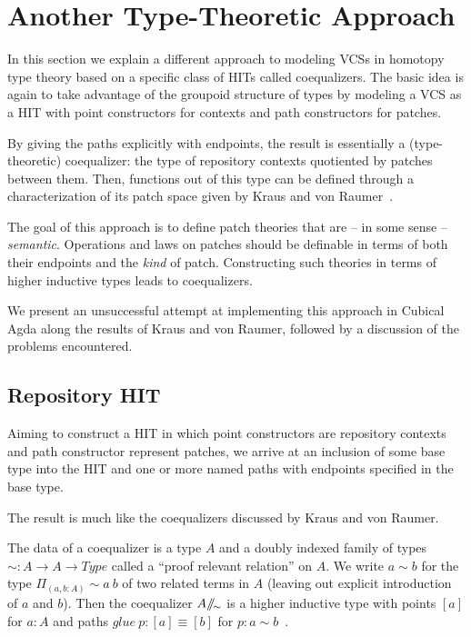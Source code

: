 \chapter{Another Type-Theoretic Approach}\label{sec:attempt}

In this section we explain a different approach to modeling VCSs in homotopy
type theory based on a specific class of HITs called coequalizers. The basic
idea is again to take advantage of the groupoid structure of types by modeling a
VCS as a HIT with point constructors for contexts and path constructors for
patches.

By giving the paths explicitly with endpoints, the result is essentially a
(type-theoretic) coequalizer: the type of repository contexts quotiented by
patches between them. Then, functions out of this type can be defined through a
characterization of its patch space given by Kraus and von Raumer~\cite{kraus2019path}.

The goal of this approach is to define patch theories that are -- in some sense
-- \emph{semantic}. Operations and laws on patches should be definable in terms
of both their endpoints and the \emph{kind} of patch. Constructing such theories in
terms of higher inductive types leads to coequalizers.

We present an unsuccessful attempt at implementing this approach in Cubical Agda
along the results of Kraus and von Raumer, followed by a discussion of the
problems encountered.

\section{Repository HIT}

Aiming to construct a HIT in which point constructors are repository contexts and
path constructor represent patches, we arrive at an inclusion of some base type
into the HIT and one or more named paths with endpoints specified in the base type.

The result is much like the coequalizers discussed by Kraus and von Raumer.

The data of a coequalizer is a type $A$ and a doubly indexed family of types $\sim : A
\rightarrow A \rightarrow Type$ called a ``proof relevant relation'' on $A$. We
write $a \sim b$ for the type $\Pi_{(a,b : A)} \sim a~b$ of two related terms in
$A$ (leaving out explicit introduction of $a$ and $b$).
Then the coequalizer $A /\!\!/\!_{\sim}$ is a higher inductive type with points $[a]$ for
$a : A$ and paths $glue~p : [a] \equiv [b]$ for $p : a \sim b$~\cite{kraus2019path}.

